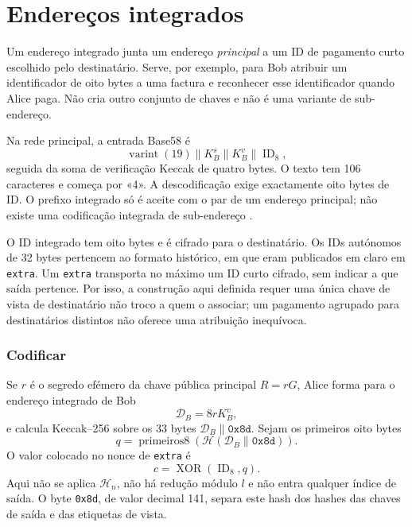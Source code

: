 \section{Endereços integrados}
\label{sec:integrated-addresses}

%
Um endereço integrado junta um endereço \emph{principal} a um ID de pagamento
curto escolhido pelo destinatário. Serve, por exemplo, para Bob atribuir um
identificador de oito bytes a uma factura e reconhecer esse identificador
quando Alice paga. Não cria outro conjunto de chaves e não é uma variante de
sub-endereço.

Na rede principal, a entrada Base58 é
\[
 \operatorname{varint}(19)\mathbin\|K_B^s\mathbin\|K_B^v
 \mathbin\|\operatorname{ID}_{8},
\]
seguida da soma de verificação Keccak de quatro bytes. O texto tem 106
caracteres e começa por «4». A descodificação exige exactamente
oito bytes de ID. O prefixo integrado só é aceite com o par de um endereço
principal; não existe uma codificação integrada de sub-endereço
\cite{integrated-addresses}.

%
O ID integrado tem oito bytes e é cifrado para o destinatário. Os IDs
autónomos de 32 bytes pertencem ao formato histórico, em que eram publicados
em claro em \texttt{extra}. Um \texttt{extra} transporta no máximo um ID
curto cifrado, sem indicar a que saída pertence. Por isso, a construção
aqui definida requer uma única chave de vista de destinatário não troco a quem o
associar; um pagamento agrupado para destinatários distintos não oferece uma
atribuição inequívoca.

\subsubsection*{Codificar}

Se \(r\) é o segredo efémero da chave pública principal
\(R=rG\), Alice forma para o endereço integrado de Bob
\[
 \mathcal D_B=8rK_B^v,
\]
e calcula Keccak--256 sobre os 33 bytes
\(\mathcal D_B\mathbin\|\texttt{0x8d}\). Sejam os primeiros oito bytes
\[
 q=\operatorname{primeiros8}\!\left(
   \mathcal H(\mathcal D_B\mathbin\|\texttt{0x8d})\right).
\]
O valor colocado no nonce de \texttt{extra} é
\[
 c=\operatorname{XOR}(\operatorname{ID}_{8},q).
\]
Aqui não se aplica \(\mathcal H_n\), não há redução módulo \(l\) e não entra
qualquer índice de saída. O byte \texttt{0x8d}, de valor decimal 141, separa
este hash dos hashes das chaves de saída e das etiquetas de vista.


